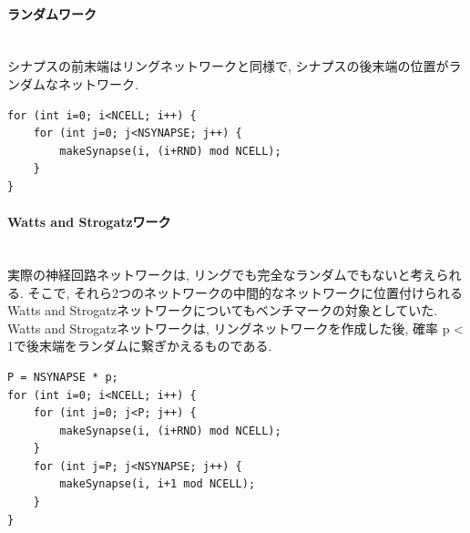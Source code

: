 \paragraph{ランダムワーク}~\\
シナプスの前末端はリングネットワークと同様で, シナプスの後末端の位置がランダムなネットワーク.
{\footnotesize
\begin{lstlisting}[numbers=none, caption=ランダムネットワークの作成]
for (int i=0; i<NCELL; i++) {
    for (int j=0; j<NSYNAPSE; j++) {
        makeSynapse(i, (i+RND) mod NCELL);
    }
}
\end{lstlisting}
}
\paragraph{Watts and Strogatzワーク}~\\
実際の神経回路ネットワークは, リングでも完全なランダムでもないと考えられる.
そこで, それら2つのネットワークの中間的なネットワークに位置付けられるWatts and Strogatzネットワークについてもベンチマークの対象としていた.
Watts and Strogatzネットワークは, リングネットワークを作成した後, 確率 p < 1で後末端をランダムに繋ぎかえるものである.
{\footnotesize
\begin{lstlisting}[numbers=none, caption=Watts and Strogatzネットワークの作成]
P = NSYNAPSE * p;
for (int i=0; i<NCELL; i++) {
    for (int j=0; j<P; j++) {
        makeSynapse(i, (i+RND) mod NCELL);
    }
    for (int j=P; j<NSYNAPSE; j++) {
        makeSynapse(i, i+1 mod NCELL);
    }
}
\end{lstlisting}
}
